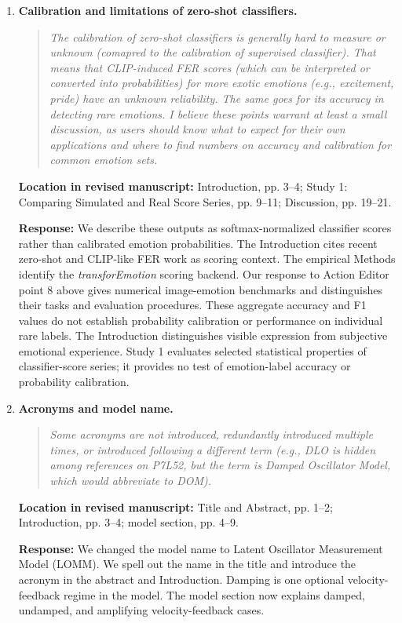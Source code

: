 \documentclass[11pt]{article}
\newenvironment{reviewquote}{\begin{quote}\small\itshape}{\end{quote}}
\newcommand{\point}[1]{\textbf{#1.}}
\newcommand{\location}[1]{\textbf{Location in revised manuscript:} #1\par}
\newcommand{\response}{\textbf{Response:} }
\begin{document}
\begin{enumerate}
  \item \point{Calibration and limitations of zero-shot classifiers}
  \begin{reviewquote}
  The calibration of zero-shot classifiers is generally hard to measure or unknown (comapred to the calibration of supervised classifier). That means that CLIP-induced FER scores (which can be interpreted or converted into probabilities) for more exotic emotions (e.g., excitement, pride) have an unknown reliability. The same goes for its accuracy in detecting rare emotions. I believe these points warrant at least a small discussion, as users should know what to expect for their own applications and where to find numbers on accuracy and calibration for common emotion sets.
  \end{reviewquote}
  \location{Introduction, pp. 3--4; Study 1: Comparing Simulated and Real Score Series, pp. 9--11; Discussion, pp. 19--21.}
  \response We describe these outputs as softmax-normalized classifier scores rather than calibrated emotion probabilities. The Introduction cites recent zero-shot and CLIP-like FER work as scoring context. The empirical Methods identify the \textit{transforEmotion} scoring backend. Our response to Action Editor point 8 above gives numerical image-emotion benchmarks and distinguishes their tasks and evaluation procedures. These aggregate accuracy and F1 values do not establish probability calibration or performance on individual rare labels. The Introduction distinguishes visible expression from subjective emotional experience. Study 1 evaluates selected statistical properties of classifier-score series; it provides no test of emotion-label accuracy or probability calibration.

  \item \point{Acronyms and model name}
  \begin{reviewquote}
  Some acronyms are not introduced, redundantly introduced multiple times, or introduced following a different term (e.g., DLO is hidden among references on P7L52, but the term is Damped Oscillator Model, which would abbreviate to DOM).
  \end{reviewquote}
  \location{Title and Abstract, pp. 1--2; Introduction, pp. 3--4; model section, pp. 4--9.}
  \response We changed the model name to Latent Oscillator Measurement Model (LOMM). We spell out the name in the title and introduce the acronym in the abstract and Introduction. Damping is one optional velocity-feedback regime in the model. The model section now explains damped, undamped, and amplifying velocity-feedback cases.


\end{enumerate}
\end{document}
